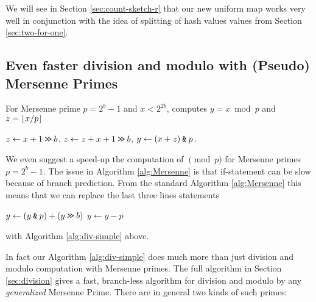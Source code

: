 We will see in Section \ref{sec:count-sketch-r} that our new uniform map
works very well in conjunction with the idea of splitting of hash values 
values from Section \ref{sec:two-for-one}.




\subsection{Even faster division and modulo with (Pseudo) Mersenne Primes}\label{subsec:intro-division}
%
\begin{algorithm}[H]
   \caption{For Mersenne prime $p=2^b-1$ and $x< 2^{2b}$, computes
   \label{alg:div-simple}
   $y=x\bmod p$ and $z=\lfloor {x/p} \rfloor$}
   \begin{algorithmic}
      \State $z \gets x+1 \mathbin{\texttt{>\!>}} b$,
      \State $z \gets z+x+1 \mathbin{\texttt{>\!>}} b$,
      \State $y \gets (x + z) \mathbin{\texttt{\&}} p $.
   \end{algorithmic}
\end{algorithm}
%
We even suggest a speed-up the computation of $\pmod p$ for Mersenne primes
$p=2^b-1$. The issue in Algorithm \ref{alg:Mersenne} is that
if-statement can be slow because of branch prediction.
From the standard Algorithm \ref{alg:Mersenne} this means that we can
replace the last three lines statements
\begin{algorithmic}
   \State $y \gets (y\mathbin{\texttt{\&}} p)+(y\mathbin{\texttt{>\!>}} b)$
      \State $y\gets y-p$
   \EndIf
\end{algorithmic}
with Algorithm \ref{alg:div-simple} above.

\vspace{1em}

In fact our Algorithm \ref{alg:div-simple} does much more than just division and modulo computation with Mersenne primes.
The full algorithm in Section \ref{sec:division} gives a fast, branch-less algorithm for division and modulo by any \emph{generalized} Mersenne Prime.
There are in general two kinds of such primes:

